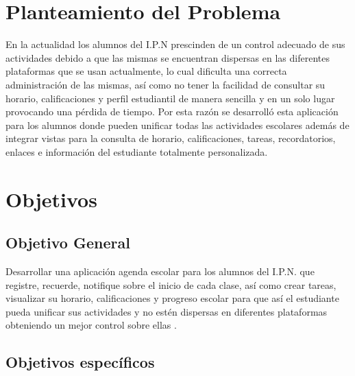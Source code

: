 \documentclass[10pt]{article}
\begin{document}
\section{Planteamiento del Problema}
\justify
En la actualidad los alumnos del I.P.N prescinden de un control adecuado de sus actividades  debido a que las mismas se encuentran dispersas en las diferentes plataformas que se usan actualmente, lo cual dificulta una correcta administración de las mismas, así como no tener la facilidad de consultar su horario, calificaciones y perfil estudiantil  de manera sencilla y en un solo lugar provocando una pérdida de tiempo.  Por esta razón se desarrolló esta aplicación para  los alumnos donde pueden unificar todas las actividades escolares además de integrar vistas para la consulta de horario, calificaciones, tareas, recordatorios, enlaces e información del estudiante totalmente personalizada.  


\section{Objetivos}
\subsection{Objetivo General}
\justify
Desarrollar una aplicación agenda escolar para  los alumnos del I.P.N. que registre, recuerde, notifique sobre el inicio de cada clase, así como crear tareas, visualizar su horario, calificaciones y progreso escolar para que así el estudiante pueda unificar sus actividades y no estén  dispersas en diferentes plataformas obteniendo un mejor control sobre ellas .

\subsection{Objetivos específicos}
\end{document}
